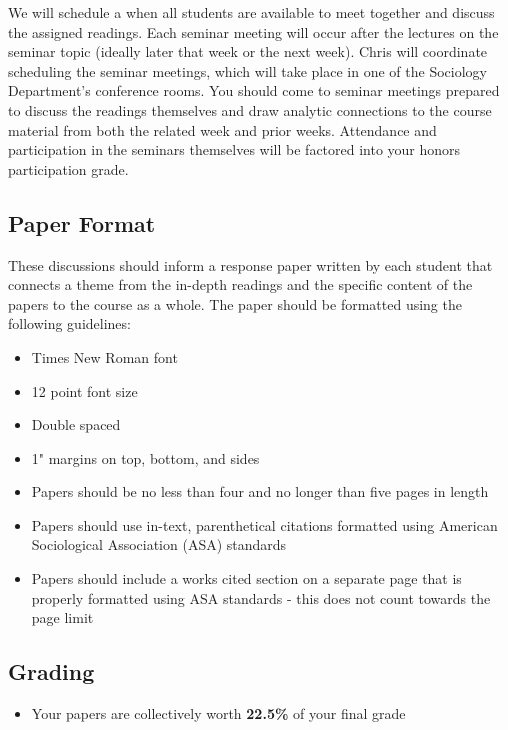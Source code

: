 \documentclass[]{book}
\providecommand{\tightlist}{%
  \setlength{\itemsep}{0pt}\setlength{\parskip}{0pt}}
\newenvironment{rmdblock}[1]
  {\begin{shaded*}
  \begin{itemize}
  \renewcommand{\labelitemi}{
    \raisebox{-.7\height}[0pt][0pt]{
      {\setkeys{Gin}{width=3em,keepaspectratio}\texttt{[image: images/\#1]}}
    }
  }
  \item
  }
  {
  \end{itemize}
  \end{shaded*}
  }
\newenvironment{rmdtip}
  {\begin{rmdblock}{tip}}
  {\end{rmdblock}}
\begin{document}
We will schedule a when all students are available to meet together and discuss the assigned readings. Each seminar meeting will occur after the lectures on the seminar topic (ideally later that week or the next week). Chris will coordinate scheduling the seminar meetings, which will take place in one of the Sociology Department's conference rooms. You should come to seminar meetings prepared to discuss the readings themselves and draw analytic connections to the course material from both the related week and prior weeks. Attendance and participation in the seminars themselves will be factored into your honors participation grade.

\hypertarget{paper-format}{%
\subsection{Paper Format}\label{paper-format}}

These discussions should inform a response paper written by each student that connects a theme from the in-depth readings and the specific content of the papers to the course as a whole. The paper should be formatted using the following guidelines:

\begin{itemize}
\tightlist
\item
  Times New Roman font
\item
  12 point font size
\item
  Double spaced
\item
  1" margins on top, bottom, and sides
\item
  Papers should be no less than four and no longer than five pages in length
\item
  Papers should use in-text, parenthetical citations formatted using American Sociological Association (ASA) standards
\item
  Papers should include a works cited section on a separate page that is properly formatted using ASA standards - this does not count towards the page limit
\end{itemize}

\hypertarget{grading-1}{%
\subsection{Grading}\label{grading-1}}

\begin{rmdtip}
Your papers are collectively worth \textbf{22.5\%} of your final grade
\end{rmdtip}
\end{document}
